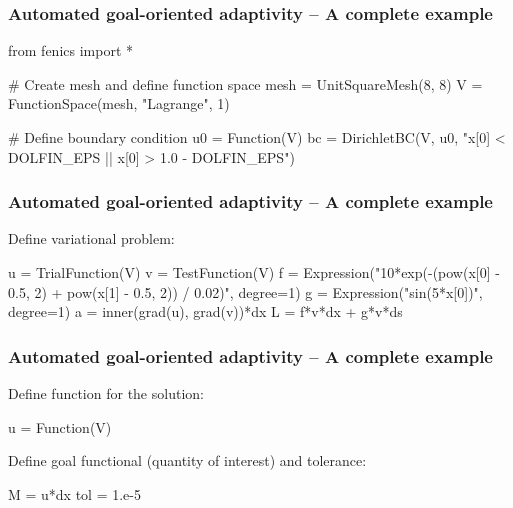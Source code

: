 \begin{frame}[fragile]
  \frametitle{Automated goal-oriented adaptivity -- A complete example}
  \vspace{-2.0em}
\begin{python}
from fenics import *

# Create mesh and define function space
mesh = UnitSquareMesh(8, 8)
V = FunctionSpace(mesh, "Lagrange", 1)

# Define boundary condition
u0 = Function(V)
bc = DirichletBC(V, u0, "x[0] < DOLFIN_EPS || x[0] > 1.0 - DOLFIN_EPS")
\end{python}
\end{frame}


\begin{frame}[fragile]
  \frametitle{Automated goal-oriented adaptivity -- A complete example}
Define variational problem:
\vspace{-1.0em}
\begin{python}
u = TrialFunction(V)
v = TestFunction(V)
f = Expression("10*exp(-(pow(x[0] - 0.5, 2) + pow(x[1] - 0.5, 2)) / 0.02)",
               degree=1)
g = Expression("sin(5*x[0])", degree=1)
a = inner(grad(u), grad(v))*dx
L = f*v*dx + g*v*ds
\end{python}
\end{frame}


\begin{frame}[fragile]
  \frametitle{Automated goal-oriented adaptivity -- A complete example}
Define function for the solution:
\vspace{-1.0em}
\begin{python}
u = Function(V)
\end{python}
\bigskip
Define goal functional (quantity of interest) and tolerance:
\vspace{-1.0em}
\begin{python}
M = u*dx
tol = 1.e-5
\end{python}
\end{frame}

